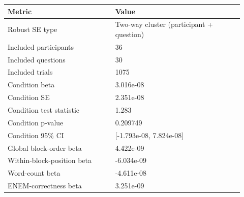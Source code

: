 \begin{tabular}{p{0.42\linewidth}p{0.50\linewidth}}
\toprule
Metric & Value\\
\midrule
Robust SE type & Two-way cluster (participant + question)\\
Included participants & 36\\
Included questions & 30\\
Included trials & 1075\\
Condition beta & 3.016e-08\\
Condition SE & 2.351e-08\\
Condition test statistic & 1.283\\
Condition p-value & 0.209749\\
Condition 95\% CI & [-1.793e-08, 7.824e-08]\\
Global block-order beta & 4.422e-09\\
Within-block-position beta & -6.034e-09\\
Word-count beta & -4.611e-08\\
ENEM-correctness beta & 3.251e-09\\
\bottomrule
\end{tabular}
